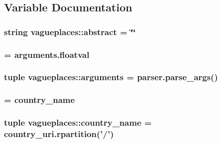 \subsection{\-Variable \-Documentation}
\hypertarget{namespacevagueplaces_af80846e508540f2e094cdcfd30da1eeb}{
\subsubsection[{abstract}]{\setlength{\rightskip}{0pt plus 5cm}string {\bf vagueplaces\-::abstract} = \char`\"{}\char`\"{}}}\label{namespacevagueplaces_af80846e508540f2e094cdcfd30da1eeb}
\hypertarget{namespacevagueplaces_a968c6f69551718c27a9617d123ac04b0}{
\subsubsection[{alpha}]{ = arguments.\-floatval}}\label{namespacevagueplaces_a968c6f69551718c27a9617d123ac04b0}
\hypertarget{namespacevagueplaces_a3f96b3b895dcb14f99c0348f7c35f90a}{
\subsubsection[{arguments}]{\setlength{\rightskip}{0pt plus 5cm}tuple {\bf vagueplaces\-::arguments} = parser.\-parse\-\_\-args()}}\label{namespacevagueplaces_a3f96b3b895dcb14f99c0348f7c35f90a}
\hypertarget{namespacevagueplaces_a0bc0e84c0011cb9531184b67d05dc0a4}{
\subsubsection[{country}]{ = {\bf country\-\_\-name}}}\label{namespacevagueplaces_a0bc0e84c0011cb9531184b67d05dc0a4}
\hypertarget{namespacevagueplaces_a439323fd94d6776127c4d46f50242309}{
\subsubsection[{country\-\_\-name}]{\setlength{\rightskip}{0pt plus 5cm}tuple {\bf vagueplaces\-::country\-\_\-name} = country\-\_\-uri.\-rpartition('/')}}\label{namespacevagueplaces_a439323fd94d6776127c4d46f50242309}
